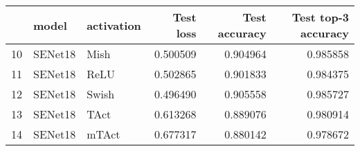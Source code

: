 \begin{tabular}{lllrrr}
\toprule
{} &    model & activation &  Test loss &  Test accuracy &  Test top-3 accuracy \\
\midrule
10 &  SENet18 &       Mish &   0.500509 &       0.904964 &             0.985858 \\
11 &  SENet18 &       ReLU &   0.502865 &       0.901833 &             0.984375 \\
12 &  SENet18 &      Swish &   0.496490 &       0.905558 &             0.985727 \\
13 &  SENet18 &       TAct &   0.613268 &       0.889076 &             0.980914 \\
14 &  SENet18 &      mTAct &   0.677317 &       0.880142 &             0.978672 \\
\bottomrule
\end{tabular}
